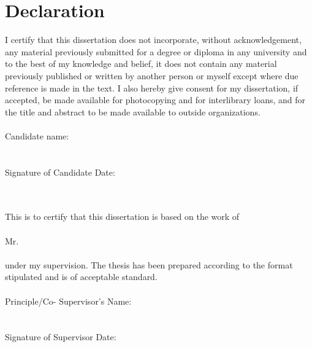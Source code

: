 \chapter*{Declaration}

I certify that this dissertation does not incorporate, without acknowledgement,
any material previously submitted for a degree or diploma in any university and
to the best of my knowledge and belief, it does not contain any material
previously published or written by another person or myself except where due
reference is made in the text.
I also hereby give consent for my dissertation, if accepted, be made available
for photocopying and for interlibrary loans, and for the title and abstract to
be made available to outside organizations.
\\~\\
\noindent Candidate name: \authorname
\\~\\
\noindent\makebox[4cm]{\dotfill}\\
Signature of Candidate \hfill Date: \date: \signaturedate
\\~\\
This is to certify that this dissertation is based on the work of \\~\\
Mr. \authorname \\~\\
under my supervision. The thesis has been prepared according to the format
stipulated and is of acceptable standard.
\\~\\
Principle/Co- Supervisor’s Name: \supervisorname
\\~\\
\noindent\makebox[4cm]{\dotfill}\\
Signature of Supervisor \hfill Date: \date: \signaturedate

